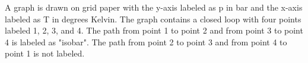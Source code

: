 A graph is drawn on grid paper with the y-axis labeled as p in bar and the x-axis labeled as T in degrees Kelvin. The graph contains a closed loop with four points labeled 1, 2, 3, and 4. The path from point 1 to point 2 and from point 3 to point 4 is labeled as "isobar". The path from point 2 to point 3 and from point 4 to point 1 is not labeled.